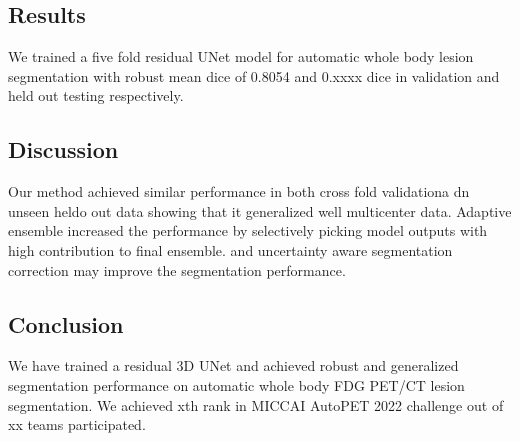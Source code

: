 \documentclass[runningheads]{llncs}
\begin{document}
\subsection{Results}
We trained a five fold residual UNet model for automatic whole body lesion segmentation with robust mean dice of 0.8054 and 0.xxxx dice in validation and held out testing respectively.

\subsection{Discussion}
Our method achieved similar performance in both cross fold validationa dn unseen heldo out data showing that it generalized well multicenter data. Adaptive ensemble increased the performance by selectively picking model outputs with high contribution to final ensemble. \cite{murugesan2021head} and uncertainty aware segmentation correction may improve the segmentation performance.

\subsection{Conclusion}
We have trained a residual 3D UNet and achieved robust and generalized segmentation performance on automatic whole body FDG PET/CT lesion segmentation. We achieved xth rank in MICCAI AutoPET 2022 challenge out of xx teams participated.


\end{document}
